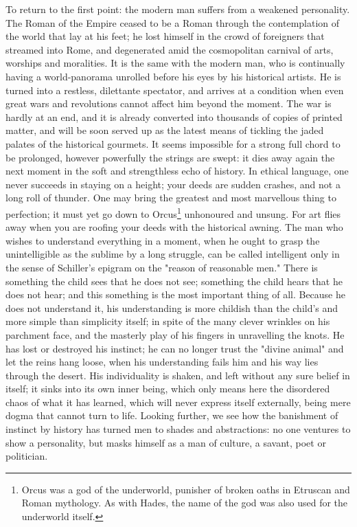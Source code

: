 To return to the first point: the modern man suffers from a weakened
personality. The Roman of the Empire ceased to be a Roman through the
contemplation of the world that lay at his feet; he lost himself in
the crowd of foreigners that streamed into Rome, and degenerated amid
the cosmopolitan carnival of arts, worships and moralities. It is the
same with the modern man, who is continually having a world-panorama
unrolled before his eyes by his historical artists. He is turned into
a restless, dilettante spectator, and arrives at a condition when
even great wars and revolutions cannot affect him beyond the moment.
The war is hardly at an end, and it is already converted into
thousands of copies of printed matter, and will be soon served up as
the latest means of tickling the jaded palates of the historical
gourmets. It seems impossible for a strong full chord to be
prolonged, however powerfully the strings are swept: it dies away
again the next moment in the soft and strengthless echo of history.
In ethical language, one never succeeds in staying on a height; your
deeds are sudden crashes, and not a long roll of thunder. One may
bring the greatest and most marvellous thing to perfection; it must
yet go down to Orcus\footnote{Orcus was a god of the underworld, punisher of broken oaths in Etruscan and Roman mythology. As with Hades, the name of the god was also used for the underworld itself.} unhonoured and unsung. For art flies away when
you are roofing your deeds with the historical awning. The man who
wishes to understand everything in a moment, when he ought to grasp
the unintelligible as the sublime by a long struggle, can be called
intelligent only in the sense of Schiller's epigram on the "reason of
reasonable men." There is something the child sees that he does not
see; something the child hears that he does not hear; and this
something is the most important thing of all. Because he does not
understand it, his understanding is more childish than the child's
and more simple than simplicity itself; in spite of the many clever
wrinkles on his parchment face, and the masterly play of his fingers
in unravelling the knots. He has lost or destroyed his instinct; he
can no longer trust the "divine animal" and let the reins hang loose,
when his understanding fails him and his way lies through the desert.
His individuality is shaken, and left without any sure belief in
itself; it sinks into its own inner being, which only means here the
disordered chaos of what it has learned, which will never express
itself externally, being mere dogma that cannot turn to life. Looking
further, we see how the banishment of instinct by history has turned
men to shades and abstractions: no one ventures to show a
personality, but masks himself as a man of culture, a savant, poet or
politician.

